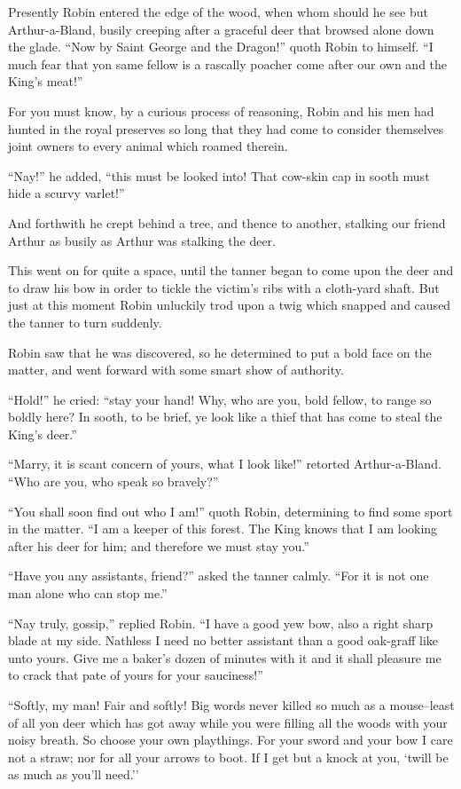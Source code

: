 Presently Robin entered the edge of the wood, when whom should he see
but Arthur-a-Bland, busily creeping after a graceful deer that browsed
alone down the glade. ``Now by Saint George and the Dragon!'' quoth
Robin to himself. ``I much fear that yon same fellow is a rascally
poacher come after our own and the King's meat!''

For you must know, by a curious process of reasoning, Robin and his men
had hunted in the royal preserves so long that they had come to consider
themselves joint owners to every animal which roamed therein.

``Nay!'' he added, ``this must be looked into! That cow-skin cap in
sooth must hide a scurvy varlet!''

And forthwith he crept behind a tree, and thence to another, stalking
our friend Arthur as busily as Arthur was stalking the deer.

This went on for quite a space, until the tanner began to come upon the
deer and to draw his bow in order to tickle the victim's ribs with a
cloth-yard shaft. But just at this moment Robin unluckily trod upon a
twig which snapped and caused the tanner to turn suddenly.

Robin saw that he was discovered, so he determined to put a bold face on
the matter, and went forward with some smart show of authority.

``Hold!'' he cried: ``stay your hand! Why, who are you, bold fellow, to
range so boldly here? In sooth, to be brief, ye look like a thief that
has come to steal the King's deer.''

``Marry, it is scant concern of yours, what I look like!'' retorted
Arthur-a-Bland. ``Who are you, who speak so bravely?''

``You shall soon find out who I am!'' quoth Robin, determining to find
some sport in the matter. ``I am a keeper of this forest. The King knows
that I am looking after his deer for him; and therefore we must stay
you.''

``Have you any assistants, friend?'' asked the tanner calmly. ``For it
is not one man alone who can stop me.''

``Nay truly, gossip,'' replied Robin. ``I have a good yew bow, also a
right sharp blade at my side. Nathless I need no better assistant than a
good oak-graff like unto yours. Give me a baker's dozen of minutes with
it and it shall pleasure me to crack that pate of yours for your
sauciness!''

``Softly, my man! Fair and softly! Big words never killed so much as a
mouse--least of all yon deer which has got away while you were filling
all the woods with your noisy breath. So choose your own playthings. For
your sword and your bow I care not a straw; nor for all your arrows to
boot. If I get but a knock at you, `twill be as much as you'll need.''

